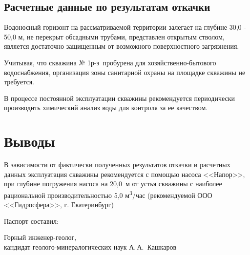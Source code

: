 \documentclass[a4paper,12pt]{article} %
\newcommand{\txtExecutor}{ООО <<Гидросфера>>}	%
\newcommand{\txtNumber}{№ 1р-э}  				%
\newcommand{\txtPump}{<<Напор>>}  				%
\newcommand{\txtDepth}{50,0}					%
\newcommand{\txtDebit}{5,0}						%
\newcommand{\txtHorizDepth}{30,0}				%
\newcommand{\txtPumpDepth}{20,0}				%
\begin{document}
\subsection*{Расчетные данные по результатам откачки}

Водоносный горизонт на рассматриваемой территории залегает на глубине 	{\txtHorizDepth} - {\txtDepth}	м, не перекрыт обсадными трубами, представлен открытым стволом, является достаточно защищенным от возможного поверхностного загрязнения.

Учитывая, что скважина \txtNumber \, пробурена для хозяйственно-бытового водоснабжения, организация зоны санитарной охраны на площадке скважины не требуется.

В процессе постоянной эксплуатации скважины рекомендуется периодически производить химический анализ воды для контроля за ее качеством.

\section*{Выводы}

В зависимости от фактически полученных результатов откачки и расчетных данных эксплуатация скважины рекомендуется с помощью насоса  \txtPump, при глубине погружения насоса  на \underline{\txtPumpDepth} \,м от устья скважины с наиболее рациональной производительностью 	{\txtDebit} м\textsuperscript{3}/час (рекомендуемой \txtExecutor, г. Екатеринбург)

\bigskip

Паспорт составил:

\bigskip

\begin{minipage}{1.0\textwidth}
	Горный инженер-геолог,\\
	кандидат геолого-минералогических наук 
	А.\,А.~Кашкаров
\end{minipage}
\end{document}
